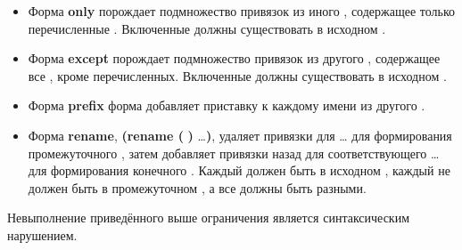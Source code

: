 \begin{itemize}
\item Форма {\cf\bfseries only} порождает подмножество привязок из иного ,
  содержащее только перечисленные . Включенные  должны
  существовать в исходном .
\item Форма {\cf\bfseries except} порождает подмножество привязок из другого ,
  содержащее все , кроме перечисленных. Включенные  должны
  существовать в исходном .
\item Форма {\cf\bfseries prefix} форма добавляет приставку  к каждому
  имени из другого .
\item Форма {\cf\bfseries rename}, {\cf \textbf{(rename (}
  \textbf{)} \ldots\textbf{)}}, удаляет привязки для {\cf
   \ldots} для формирования промежуточного , затем
  добавляет привязки назад для соответствующего {\cf {} \ldots} для
  формирования конечного . Каждый  должен быть в исходном
  , каждый  не должен быть в промежуточном
  , а все  должны быть разными.
\end{itemize}\vspace{1mm}
Невыполнение приведённого выше ограничения является синтаксическим нарушением.\vspace{1mm}

